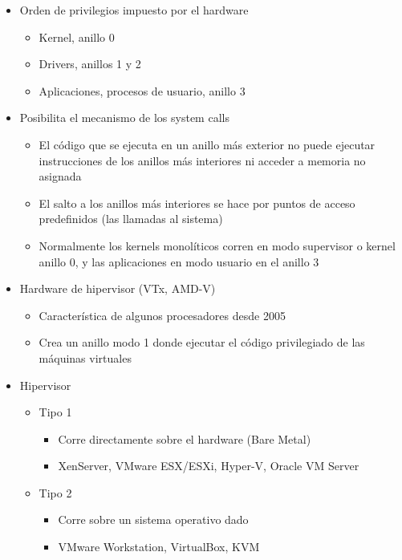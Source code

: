 \begin{itemize}
	\item Orden de privilegios impuesto por el hardware
		\begin{itemize}
		\item Kernel, anillo 0
		\item Drivers, anillos 1 y 2		
		\item Aplicaciones, procesos de usuario, anillo 3
	\end{itemize}
	\item Posibilita el mecanismo de los system calls
	\begin{itemize}
	\item El código que se ejecuta en un anillo más exterior no puede ejecutar instrucciones de los anillos más interiores ni acceder a memoria no asignada 
	\item El salto a los anillos más interiores se hace por puntos de acceso predefinidos (las llamadas al sistema)	
	\item Normalmente los kernels monolíticos corren en modo supervisor o kernel anillo 0, y las aplicaciones en modo usuario en el anillo 3
	\end{itemize}
	\item Hardware de hipervisor (VTx, AMD-V)
	\begin{itemize}
		\item Característica de algunos procesadores desde 2005
		\item Crea un anillo modo 1 donde ejecutar el código privilegiado de las máquinas virtuales
	\end{itemize}
	\item Hipervisor
	\begin{itemize}
		\item Tipo 1
		\begin{itemize}
			\item Corre directamente sobre el hardware (Bare Metal)
			\item XenServer, VMware ESX/ESXi, Hyper-V, Oracle VM Server
		\end{itemize}		
		\item Tipo 2
		\begin{itemize}
			\item Corre sobre un sistema operativo dado
			\item VMware Workstation, VirtualBox, KVM
		\end{itemize}
	\end{itemize}
\end{itemize}

